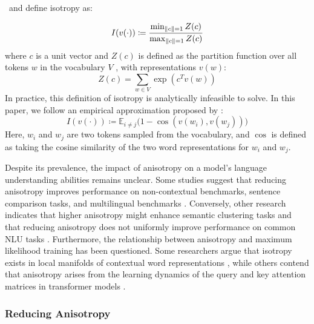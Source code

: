 \citeauthor{arora2016latent}\ and \citeauthor{mu2018all} define isotropy as:

\begin{equation}
    I(v(\cdot)) \coloneq \frac{\min_{\left\lVert c\right\rVert=1} Z(c)}{\max_{\left\lVert c\right\rVert=1} Z(c)}
\end{equation}
where $c$ is a unit vector and $Z(c)$ is defined as the partition function over all tokens $w$ in the vocabulary $V$ , with representations $v(w)$:
$$
    Z(c) = \sum_{w \in V} \exp(c^Tv(w))
$$
In practice, this definition of isotropy is analytically infeasible to solve. In this paper, we follow an empirical approximation proposed by \citeauthor{ethayarajh2019contextual}: 
\begin{equation}
\label{eq:empirical-isotropy}
    I(v(\cdot)) \coloneq \mathbb{E}_{i\ne j}\big(1-\cos(v(w_i), v(w_j))\big)
\end{equation}
Here, $w_i$ and $w_j$ are two tokens sampled from the vocabulary, and $\cos$ is defined as taking the cosine similarity of the two word representations for $w_i$ and $w_j$.  

Despite its prevalence, the impact of anisotropy on a model's language understanding abilities remains unclear. Some studies suggest that reducing anisotropy improves performance on non-contextual benchmarks, sentence comparison tasks, and multilingual benchmarks \citep{bis2021too, su2021whitening, rajaee2022isotropy}. Conversely, other research indicates that higher anisotropy might enhance semantic clustering tasks and that reducing anisotropy does not uniformly improve performance on common NLU tasks \citep{ait2023anisotropy, ding2022isotropy}. Furthermore, the relationship between anisotropy and maximum likelihood training has been questioned. Some researchers argue that isotropy exists in local manifolds of contextual word representations \citep{cai2020isotropy}, while others contend that anisotropy arises from the learning dynamics of the query and key attention matrices in transformer models \citep{godey2024anisotropy}.

\subsubsection{Reducing Anisotropy}

